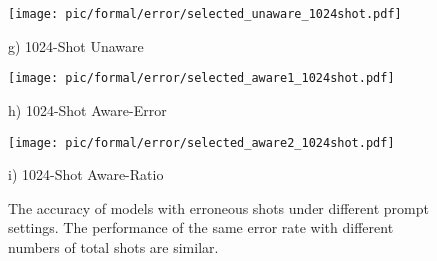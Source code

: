 \begin{figure}[ht]
    \begin{minipage}[t]{0.28\textwidth}
        \centering
        \texttt{[image: pic/formal/error/selected\_unaware\_1024shot.pdf]}
        \caption*{g) 1024-Shot Unaware}
    \end{minipage}
    \hfill
    \begin{minipage}[t]{0.28\textwidth}
        \centering
        \texttt{[image: pic/formal/error/selected\_aware1\_1024shot.pdf]}
        \caption*{h) 1024-Shot Aware-Error}
    \end{minipage}
    \hfill
    \begin{minipage}[t]{0.4\textwidth}
        \centering
        \texttt{[image: pic/formal/error/selected\_aware2\_1024shot.pdf]}
        \caption*{i) 1024-Shot Aware-Ratio}
    \end{minipage}
    
    \caption{The accuracy of models with erroneous shots under different prompt settings. The performance of the same error rate with different numbers of total shots are similar.}
    \label{fig:more_error}
\end{figure}











